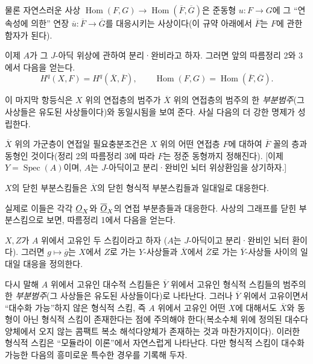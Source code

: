 물론 자연스러운 사상
$\operatorname{Hom}(F,G)\longrightarrow
\operatorname{Hom}(\overline F,\overline G)$은 준동형
$u:F\longrightarrow G$에 그 ``연속성에 의한'' 연장
$\overline u:\overline F\longrightarrow\overline G$를 대응시키는
사상이다(이 규약 아래에서 $\overline F$는 $F$에 관한 함자가 된다).

이제 $A$가 그 $J$-아딕 위상에 관하여 분리·완비라고 하자. 그러면 앞의
따름정리 2와 3에서 다음을 얻는다.
\[
  H^{q}(X,F)=H^{q}(\overline X,\overline F),
  \qquad
  \operatorname{Hom}(F,G)
  =\operatorname{Hom}(\overline F,\overline G).
\]

이 마지막 항등식은 $X$ 위의 연접층의 범주가 $\overline X$ 위의 연접층의
범주의 한 \emph{부분범주}(그 사상들은 유도된 사상들이다)와 동일시됨을
보여 준다. 사실 다음의 더 강한 명제가 성립한다.

 $\overline X$ 위의 가군층이 연접일 필요충분조건은
$X$ 위의 어떤 연접층 $F$에 대하여 $\overline F$ 꼴의 층과 동형인
것이다(정리 2의 따름정리 3에 따라 $F$는 정준 동형까지 정해진다).
[이제 $Y=\operatorname{Spec}(A)$이며, $A$는 $J$-아딕이고 분리·완비인
뇌터 위상환임을 상기하자.]

 $X$의 닫힌 부분스킴들은 $\overline X$의 닫힌 형식적
부분스킴들과 일대일로 대응한다.

실제로 이들은 각각 $\underline{O}_X$와 $\overline{\underline{O}}_X$의 연접 부분층들과
대응한다. 사상의 그래프를 닫힌 부분스킴으로 보면, 따름정리 1에서 다음을
얻는다.

 $X,Z$가 $A$ 위에서 고유인 두 스킴이라고 하자
($A$는 $J$-아딕이고 분리·완비인 뇌터 환이다). 그러면
$g\longmapsto\overline g$는 $X$에서 $Z$로 가는 $Y$-사상들과
$\overline X$에서 $\overline Z$로 가는 $\overline Y$-사상들 사이의
일대일 대응을 정의한다.

다시 말해 $A$ 위에서 고유인 대수적 스킴들은 $\overline Y$ 위에서 고유인
형식적 스킴들의 범주의 한 \emph{부분범주}(그 사상들은 유도된 사상들이다)로
나타난다. 그러나 $\overline Y$ 위에서 고유이면서 ``대수화 가능''하지
않은 형식적 스킴, 즉 $A$ 위에서 고유인 어떤 $X$에 대해서도 $\overline X$와
동형이 아닌 형식적 스킴이 존재한다는 점에 주의해야 한다(복소수체 위에
정의된 대수다양체에서 오지 않는 콤팩트 복소 해석다양체가 존재하는 것과
마찬가지이다). 이러한 형식적 스킴은 ``모듈라이 이론''에서 자연스럽게
나타난다. 다만 형식적 스킴이 대수화 가능한 다음의 흥미로운 특수한 경우를
기록해 두자.

